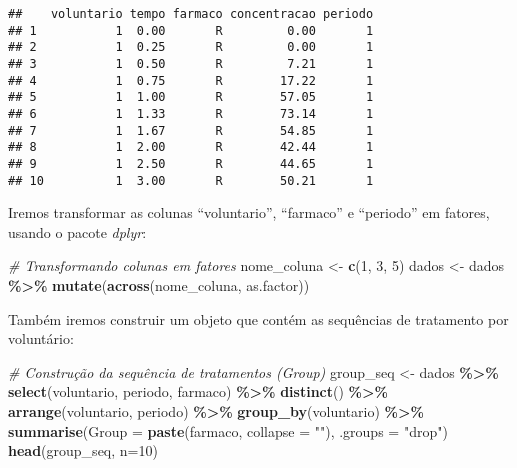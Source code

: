 \documentclass[
]{article}
\newenvironment{Shaded}{\begin{snugshade}}{\end{snugshade}}
\newcommand{\AttributeTok}[1]{\textcolor[rgb]{0.13,0.29,0.53}{#1}}
\newcommand{\CommentTok}[1]{\textcolor[rgb]{0.56,0.35,0.01}{\textit{#1}}}
\newcommand{\DecValTok}[1]{\textcolor[rgb]{0.00,0.00,0.81}{#1}}
\newcommand{\FunctionTok}[1]{\textcolor[rgb]{0.13,0.29,0.53}{\textbf{#1}}}
\newcommand{\NormalTok}[1]{#1}
\newcommand{\OtherTok}[1]{\textcolor[rgb]{0.56,0.35,0.01}{#1}}
\newcommand{\SpecialCharTok}[1]{\textcolor[rgb]{0.81,0.36,0.00}{\textbf{#1}}}
\newcommand{\StringTok}[1]{\textcolor[rgb]{0.31,0.60,0.02}{#1}}
\begin{document}
\begin{verbatim}
##    voluntario tempo farmaco concentracao periodo
## 1           1  0.00       R         0.00       1
## 2           1  0.25       R         0.00       1
## 3           1  0.50       R         7.21       1
## 4           1  0.75       R        17.22       1
## 5           1  1.00       R        57.05       1
## 6           1  1.33       R        73.14       1
## 7           1  1.67       R        54.85       1
## 8           1  2.00       R        42.44       1
## 9           1  2.50       R        44.65       1
## 10          1  3.00       R        50.21       1
\end{verbatim}

Iremos transformar as colunas ``voluntario'', ``farmaco'' e ``periodo''
em fatores, usando o pacote \emph{dplyr}:

\begin{Shaded}
\begin{Highlighting}[]
\CommentTok{\# Transformando colunas em fatores}
\NormalTok{nome\_coluna }\OtherTok{\textless{}{-}} \FunctionTok{c}\NormalTok{(}\DecValTok{1}\NormalTok{, }\DecValTok{3}\NormalTok{, }\DecValTok{5}\NormalTok{)}
\NormalTok{dados }\OtherTok{\textless{}{-}}\NormalTok{ dados }\SpecialCharTok{\%\textgreater{}\%}
  \FunctionTok{mutate}\NormalTok{(}\FunctionTok{across}\NormalTok{(nome\_coluna, as.factor))}
\end{Highlighting}
\end{Shaded}

Também iremos construir um objeto que contém as sequências de tratamento
por voluntário:

\begin{Shaded}
\begin{Highlighting}[]
\CommentTok{\# Construção da sequência de tratamentos (Group)}
\NormalTok{group\_seq }\OtherTok{\textless{}{-}}\NormalTok{ dados }\SpecialCharTok{\%\textgreater{}\%}
  \FunctionTok{select}\NormalTok{(voluntario, periodo, farmaco) }\SpecialCharTok{\%\textgreater{}\%}
  \FunctionTok{distinct}\NormalTok{() }\SpecialCharTok{\%\textgreater{}\%}
  \FunctionTok{arrange}\NormalTok{(voluntario, periodo) }\SpecialCharTok{\%\textgreater{}\%}
  \FunctionTok{group\_by}\NormalTok{(voluntario) }\SpecialCharTok{\%\textgreater{}\%}
  \FunctionTok{summarise}\NormalTok{(}\AttributeTok{Group =} \FunctionTok{paste}\NormalTok{(farmaco, }\AttributeTok{collapse =} \StringTok{""}\NormalTok{), }\AttributeTok{.groups =} \StringTok{"drop"}\NormalTok{)}
\FunctionTok{head}\NormalTok{(group\_seq, }\AttributeTok{n=}\DecValTok{10}\NormalTok{)}
\end{Highlighting}
\end{Shaded}
\end{document}

